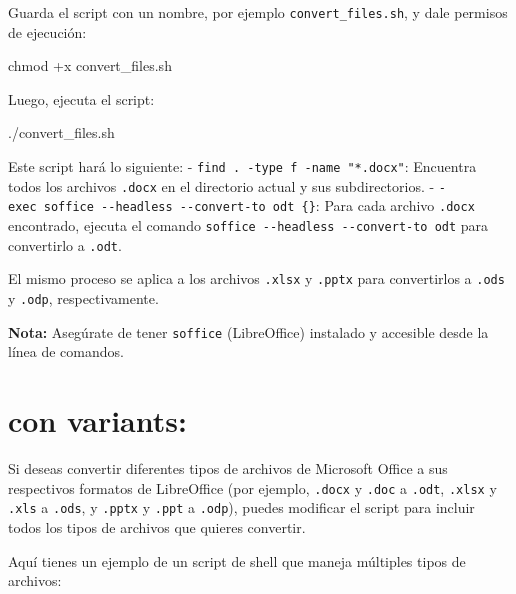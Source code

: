 \documentclass[
  jou,
  floatsintext,
  longtable,
  a4paper,
  nolmodern,
  notxfonts,
  notimes,
  colorlinks=true,linkcolor=blue,citecolor=blue,urlcolor=blue]{apa7}
\newenvironment{Shaded}{\begin{snugshade}}{\end{snugshade}}
\newcommand{\ExtensionTok}[1]{\textcolor[rgb]{0.00,0.23,0.31}{#1}}
\newcommand{\FunctionTok}[1]{\textcolor[rgb]{0.28,0.35,0.67}{#1}}
\newcommand{\NormalTok}[1]{\textcolor[rgb]{0.00,0.23,0.31}{#1}}
\begin{document}
Guarda el script con un nombre, por ejemplo \texttt{convert\_files.sh},
y dale permisos de ejecución:

\begin{Shaded}
\begin{Highlighting}[]
\FunctionTok{chmod}\NormalTok{ +x convert\_files.sh}
\end{Highlighting}
\end{Shaded}

Luego, ejecuta el script:

\begin{Shaded}
\begin{Highlighting}[]
\ExtensionTok{./convert\_files.sh}
\end{Highlighting}
\end{Shaded}

Este script hará lo siguiente: -
\texttt{find\ .\ -type\ f\ -name\ "*.docx"}: Encuentra todos los
archivos \texttt{.docx} en el directorio actual y sus subdirectorios. -
\texttt{-exec\ soffice\ -\/-headless\ -\/-convert-to\ odt\ \{\}}: Para
cada archivo \texttt{.docx} encontrado, ejecuta el comando
\texttt{soffice\ -\/-headless\ -\/-convert-to\ odt} para convertirlo a
\texttt{.odt}.

El mismo proceso se aplica a los archivos \texttt{.xlsx} y
\texttt{.pptx} para convertirlos a \texttt{.ods} y \texttt{.odp},
respectivamente.

\textbf{Nota:} Asegúrate de tener \texttt{soffice} (LibreOffice)
instalado y accesible desde la línea de comandos.

\section{con variants:}\label{con-variants}

Si deseas convertir diferentes tipos de archivos de Microsoft Office a
sus respectivos formatos de LibreOffice (por ejemplo, \texttt{.docx} y
\texttt{.doc} a \texttt{.odt}, \texttt{.xlsx} y \texttt{.xls} a
\texttt{.ods}, y \texttt{.pptx} y \texttt{.ppt} a \texttt{.odp}), puedes
modificar el script para incluir todos los tipos de archivos que quieres
convertir.

Aquí tienes un ejemplo de un script de shell que maneja múltiples tipos
de archivos:
\end{document}
